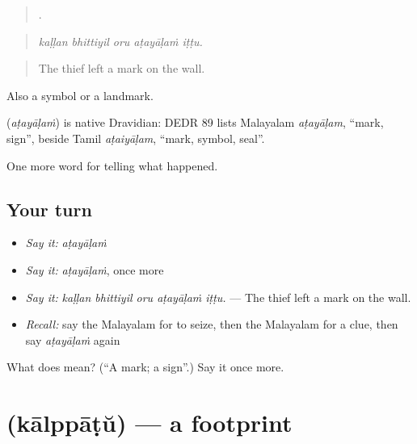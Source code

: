 \begin{quote}
    .
\end{quote}

\begin{quote}
\emph{kaḷḷan bhittiyil oru aṭayāḷaṁ iṭṭu.}
\end{quote}

\begin{quote}
The thief left a mark on the wall.
\end{quote}

Also a symbol or a landmark.

\begin{cousinweb}
\textbf{} (\emph{aṭayāḷaṁ}) is native Dravidian: DEDR 89 lists Malayalam \emph{aṭayāḷam}, \textquotedblleft{}mark, sign\textquotedblright{}, beside Tamil \emph{aṭaiyāḷam}, \textquotedblleft{}mark, symbol, seal\textquotedblright{}.
\end{cousinweb}

\begin{grammarlens}[title={What you've built}]
One more word for telling what happened.
\end{grammarlens}

\subsection*{Your turn}
\begin{itemize}
\raggedright
  \item \emph{Say it:} \emph{aṭayāḷaṁ}
  \item \emph{Say it:} \emph{aṭayāḷaṁ}, once more
  \item \emph{Say it:} \emph{kaḷḷan bhittiyil oru aṭayāḷaṁ iṭṭu.} — The thief left a mark on the wall.
  \item \emph{Recall:} say the Malayalam for to seize, then the Malayalam for a clue, then say \emph{aṭayāḷaṁ} again
\end{itemize}

\begin{tcolorbox}[breakable,colback=teal!4,colframe=teal!35!black,title={Before you move on}]
What does  mean? (\textquotedblleft{}A mark; a sign\textquotedblright{}.) Say it once more.
\end{tcolorbox}
\section[\texorpdfstring{\ml{കാൽപ്പാട്} (kālppāṭŭ)}{കാൽപ്പാട് (kālppāṭŭ)}]{ (kālppāṭŭ) — a footprint}

